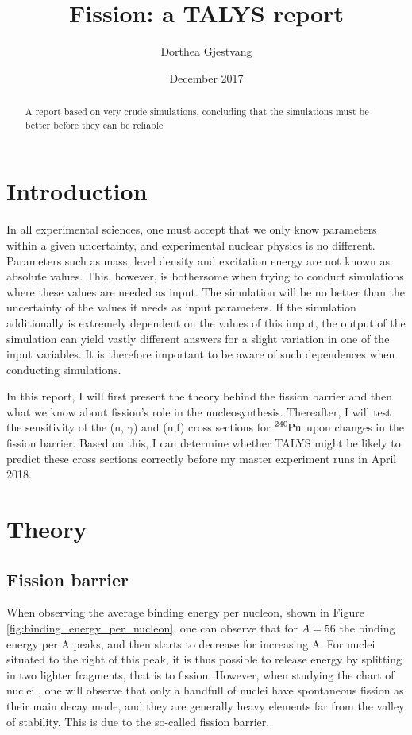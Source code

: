 \documentclass[]{article}
\title{}
\author{}
\begin{document}
	
\title{Fission: a TALYS report}
\author{Dorthea Gjestvang }
\date{December 2017}

\maketitle

\begin{abstract}
A report based on very crude simulations, concluding that the simulations must be better before they can be reliable
\end{abstract}

\section{Introduction}

In all experimental sciences, one must accept that we only know parameters within a given uncertainty, and experimental nuclear physics is no different. Parameters such as mass, level density and excitation energy are not known as absolute values. This, however, is bothersome when trying to conduct simulations where these values are needed as input. The simulation will be no better than the uncertainty of the values it needs as input parameters. If the simulation additionally is extremely dependent on the values of this imput, the output of the simulation can yield vastly different answers for a slight variation in one of the input variables. It is therefore important to be aware of such dependences when conducting simulations. 

\par 
\vspace{3mm}

 \noindent In this report, I will first present the theory behind the fission barrier and then what we know about fission's role in the nucleosynthesis. Thereafter, I will test the sensitivity of the (n, $\gamma$) and (n,f) cross sections for $\ce{^{240}Pu}$ upon changes in the fission barrier. Based on this, I can determine whether TALYS might be likely to predict these cross sections correctly before my master experiment runs in April 2018.

\section{Theory}
\label{Theory}
\subsection{Fission barrier}
When observing the average binding energy per nucleon, shown in Figure \ref{fig:binding_energy_per_nucleon}, one can observe that for $A = 56$ the binding energy per A peaks, and then starts to decrease for increasing A. For nuclei situated to the right of this peak, it is thus possible to release energy by splitting in two lighter fragments, that is to fission. However, when studying the chart of nuclei , one will observe that only a handfull of nuclei have spontaneous fission as their main decay mode, and they are generally heavy elements far from the valley of stability. This  is due to the so-called fission barrier. 
\par
\vspace{3mm}
\end{document}
